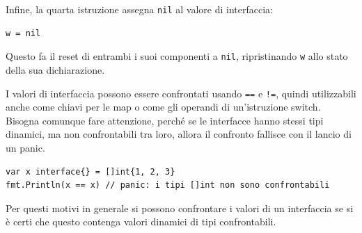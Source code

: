\documentclass[../../thesis.tex]{subfiles}
\begin{document}
    \justifying\noindent Infine, la quarta istruzione assegna \verb"nil" al valore di interfaccia:
    \begin{lstlisting}[frame = single,label={lst:lstlisting6-5.5}]
w = nil
    \end{lstlisting}
    Questo fa il reset di entrambi i suoi componenti a \verb"nil", ripristinando \verb"w" allo stato della sua dichiarazione.
    \hfill \vspace{12pt}

    I valori di interfaccia possono essere confrontati usando \verb"==" e \verb"!=", quindi utilizzabili anche come chiavi per le map o come gli operandi di un'istruzione switch.
    Bisogna comunque fare attenzione, perché se le interfacce hanno stessi tipi dinamici, ma non confrontabili tra loro, allora il confronto fallisce con il lancio di un panic.
    \begin{lstlisting}[frame = single,label={lst:lstlisting6-5.6}]
var x interface{} = []int{1, 2, 3}
fmt.Println(x == x) // panic: i tipi []int non sono confrontabili
    \end{lstlisting}
    Per questi motivi in generale si possono confrontare i valori di un interfaccia se si è certi che questo contenga valori dinamici di tipi confrontabili.
\end{document}
